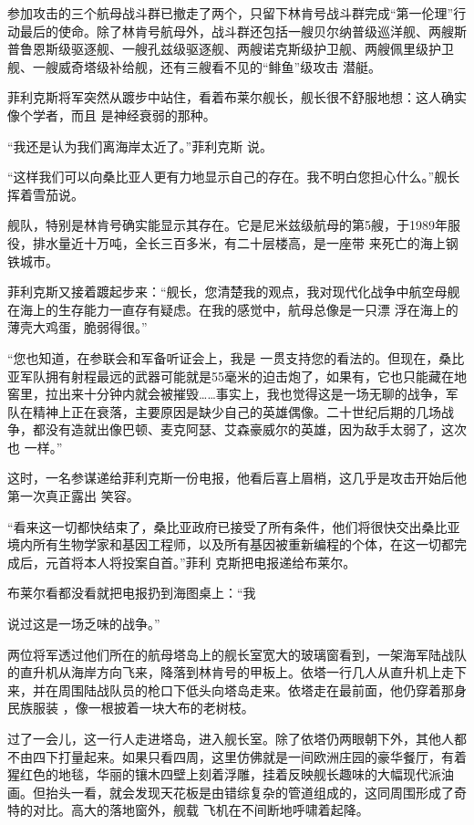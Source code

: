 \documentclass{article}
\begin{document}
参加攻击的三个航母战斗群已撤走了两个，只留下林肯号战斗群完成“第一伦理”行动最后的使命。除了林肯号航母外，战斗群还包括一艘贝尔纳普级巡洋舰、两艘斯普鲁恩斯级驱逐舰、一艘孔兹级驱逐舰、两艘诺克斯级护卫舰、两艘佩里级护卫舰、一艘威奇塔级补给舰，还有三艘看不见的“鲱鱼”级攻击
潜艇。 

\newpage

菲利克斯将军突然从踱步中站住，看着布莱尔舰长，舰长很不舒服地想：这人确实像个学者，而且
是神经衰弱的那种。 

“我还是认为我们离海岸太近了。”菲利克斯
说。 

“这样我们可以向桑比亚人更有力地显示自己的存在。我不明白您担心什么。”舰长挥着雪茄说。

舰队，特别是林肯号确实能显示其存在。它是尼米兹级航母的第5艘，于1989年服役，排水量近十万吨，全长三百多米，有二十层楼高，是一座带
来死亡的海上钢铁城市。 

菲利克斯又接着踱起步来：“舰长，您清楚我的观点，我对现代化战争中航空母舰在海上的生存能力一直存有疑虑。在我的感觉中，航母总像是一只漂
浮在海上的薄壳大鸡蛋，脆弱得很。” 

“您也知道，在参联会和军备听证会上，我是
\newpage
一贯支持您的看法的。但现在，桑比亚军队拥有射程最远的武器可能就是55毫米的迫击炮了，如果有，它也只能藏在地窖里，拉出来十分钟内就会被摧毁……事实上，我也觉得这是一场无聊的战争，军队在精神上正在衰落，主要原因是缺少自己的英雄偶像。二十世纪后期的几场战争，都没有造就出像巴顿、麦克阿瑟、艾森豪威尔的英雄，因为敌手太弱了，这次也
一样。” 

这时，一名参谋递给菲利克斯一份电报，他看后喜上眉梢，这几乎是攻击开始后他第一次真正露出
笑容。 

“看来这一切都快结束了，桑比亚政府已接受了所有条件，他们将很快交出桑比亚境内所有生物学家和基因工程师，以及所有基因被重新编程的个体，在这一切都完成后，元首将本人将投案自首。”菲利
克斯把电报递给布莱尔。 

布莱尔看都没看就把电报扔到海图桌上：“我

\newpage
说过这是一场乏味的战争。” 

两位将军透过他们所在的航母塔岛上的舰长室宽大的玻璃窗看到，一架海军陆战队的直升机从海岸方向飞来，降落到林肯号的甲板上。依塔一行几人从直升机上走下来，并在周围陆战队员的枪口下低头向塔岛走来。依塔走在最前面，他仍穿着那身民族服装
，像一根披着一块大布的老树枝。 

过了一会儿，这一行人走进塔岛，进入舰长室。除了依塔仍两眼朝下外，其他人都不由四下打量起来。如果只看四周，这里仿佛就是一间欧洲庄园的豪华餐厅，有着猩红色的地毯，华丽的镶木四壁上刻着浮雕，挂着反映舰长趣味的大幅现代派油画。但抬头一看，就会发现天花板是由错综复杂的管道组成的，这同周围形成了奇特的对比。高大的落地窗外，舰载
飞机在不间断地呼啸着起降。 
\end{document}
